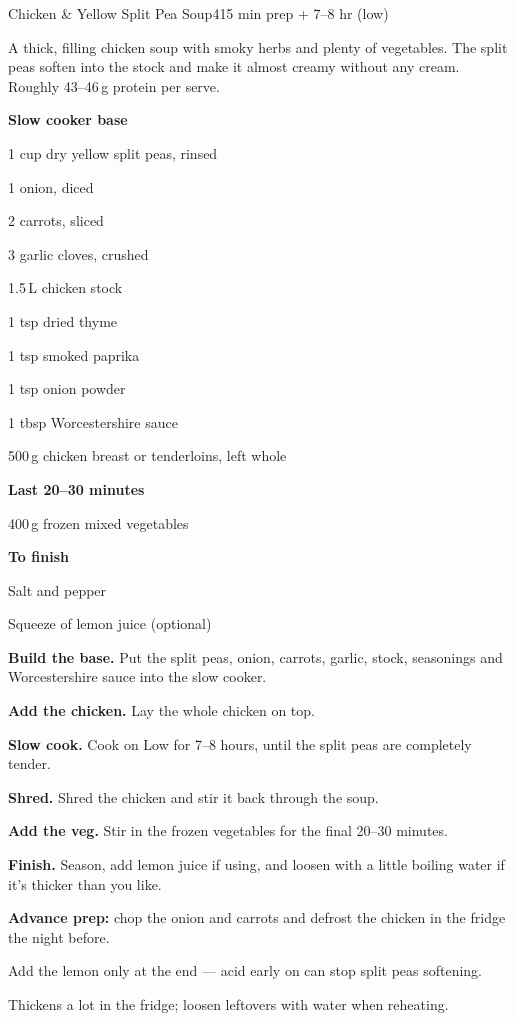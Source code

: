 \begin{recipebox}{Chicken \& Yellow Split Pea Soup}{4}{15 min prep + 7--8 hr (low)}

A thick, filling chicken soup with smoky herbs and plenty of vegetables. The
split peas soften into the stock and make it almost creamy without any cream.
Roughly 43--46\,g protein per serve.

\begin{ingredients}
  \item[] \textbf{Slow cooker base}
  \item 1 cup dry yellow split peas, rinsed
  \item 1 onion, diced
  \item 2 carrots, sliced
  \item 3 garlic cloves, crushed
  \item 1.5\,L chicken stock
  \item 1 tsp dried thyme
  \item 1 tsp smoked paprika
  \item 1 tsp onion powder
  \item 1 tbsp Worcestershire sauce
  \item 500\,g chicken breast or tenderloins, left whole
  \item[] \textbf{Last 20--30 minutes}
  \item 400\,g frozen mixed vegetables
  \item[] \textbf{To finish}
  \item Salt and pepper
  \item Squeeze of lemon juice (optional)
\end{ingredients}

\begin{method}
  \item \textbf{Build the base.} Put the split peas, onion, carrots, garlic, stock, seasonings and Worcestershire sauce into the slow cooker.
  \item \textbf{Add the chicken.} Lay the whole chicken on top.
  \item \textbf{Slow cook.} Cook on Low for 7--8 hours, until the split peas are completely tender.
  \item \textbf{Shred.} Shred the chicken and stir it back through the soup.
  \item \textbf{Add the veg.} Stir in the frozen vegetables for the final 20--30 minutes.
  \item \textbf{Finish.} Season, add lemon juice if using, and loosen with a little boiling water if it's thicker than you like.
\end{method}

\begin{notelist}
  \item \textbf{Advance prep:} chop the onion and carrots and defrost the chicken in the fridge the night before.
  \item Add the lemon only at the end --- acid early on can stop split peas softening.
  \item Thickens a lot in the fridge; loosen leftovers with water when reheating.
\end{notelist}

\end{recipebox}
